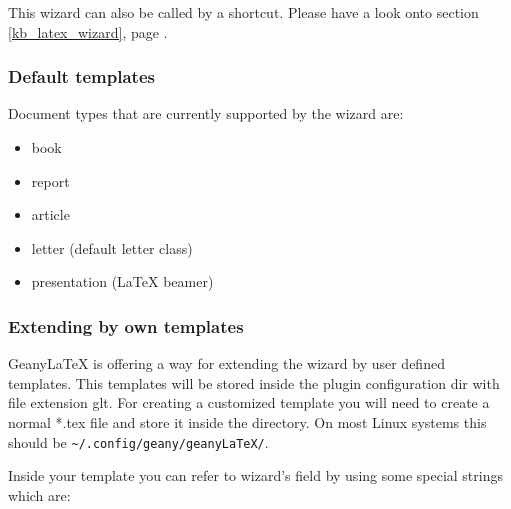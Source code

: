 \documentclass[%
a4paper,%
10pt,%
oneside,%
DIV18,
headsepline,
plainheadsepline,
footsepline,
plainfootsepline,
bibtotoc,%
liststotoc,%
BCOR12mm,%
halfparskip,%
openany,%
]{scrartcl}
\begin{document}
This wizard can also be called by a shortcut. Please have a look onto
section \ref{kb_latex_wizard}, page \pageref{kb_latex_wizard}.

\subsubsection{Default templates}
Document types that are currently supported by the wizard are:
\begin{itemize}
	\item book
	\item report
	\item article
	\item letter (default letter class)
	\item presentation (\LaTeX{} beamer)
\end{itemize}

\subsubsection{Extending by own templates}
Geany\LaTeX{} is offering a way for extending the wizard by user 
defined templates. This templates will be stored inside the plugin 
configuration dir with file extension glt. For creating a 
customized template you will need to create a normal *.tex file and 
store it inside the directory. On most Linux systems this should be 
\texttt{\textasciitilde/.config/geany/geanyLaTeX/}. 

Inside your template you can refer to wizard's field by using some special 
strings which are:
\end{document}
